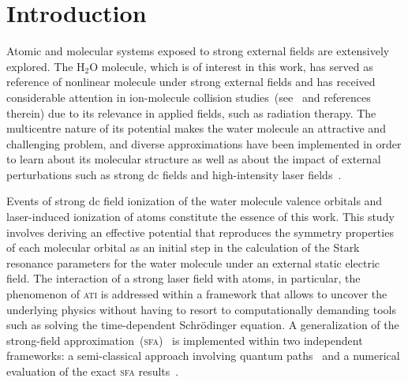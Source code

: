 \chapter{Introduction}
\label{cha:introduction}


Atomic and molecular systems exposed to strong external fields are
extensively explored. The H$_{2}$O molecule, which is of interest in
this work, has served as reference of nonlinear molecule under strong
external fields and has received considerable attention in
ion-molecule collision
studies~(see~\cite{horbatsch_2012col,illescas_2013} and references
therein) due to its relevance in applied fields, such as radiation
therapy.  The multicentre nature of its potential makes the water
molecule an attractive and challenging problem, and diverse
approximations have been implemented in order to learn about its
molecular structure as well as about the impact of external
perturbations such as strong dc fields and high-intensity laser
fields~\cite{Jagau_manybody_H2O,Toru_weakF_H2O,Krause2015_CAP_H2O,Zhao_2011_H2Otunneling,Petretti_H2O_laser}.



Events of strong dc field ionization of the water molecule valence
orbitals and laser-induced ionization of atoms constitute the essence
of this work. This study involves deriving an effective potential that
reproduces the symmetry properties of each molecular orbital as an
initial step in the calculation of the Stark resonance parameters for
the water molecule under an external static electric field.
The interaction of a strong laser field with atoms, in particular, the
phenomenon of \textsc{ati} is addressed within a framework that allows
to uncover the underlying physics without having to resort to
computationally demanding tools such as solving the time-dependent
Schr\"{o}dinger equation. A generalization of the strong-field
approximation~(\textsc{sfa})~\cite{KeldyshSFA} is implemented within
two independent frameworks: a semi-classical approach involving
quantum paths~\cite{KopoldOptComm2000} and a numerical evaluation of
the exact \textsc{sfa} results~\cite{Kopold_1997sfa}.



